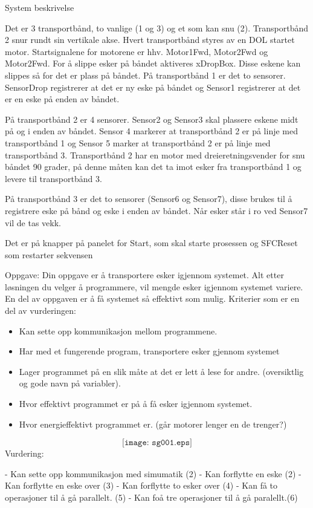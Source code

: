 

System beskrivelse

Det er 3 transportbånd, to vanlige (1 og 3) og et som kan snu (2). Transportbånd 2 snur rundt sin vertikale akse. Hvert transportbånd styres av en DOL startet motor. Startsignalene for motorene er hhv. Motor1Fwd, Motor2Fwd og Motor2Fwd. For å slippe esker på båndet aktiveres xDropBox. Disse eskene kan slippes så for det er plass på båndet. 
På transportbånd 1 er det to sensorer. SensorDrop registrerer at det er ny eske på båndet og Sensor1 registrerer at det er en eske på enden av båndet.
 
På transportbånd 2 er 4 sensorer. Sensor2 og Sensor3 skal plassere eskene midt på og i enden av båndet. Sensor 4 markerer at transportbånd 2 er på linje med transportbånd 1 og Sensor 5 marker at transportbånd 2 er på linje med transportbånd 3. Transportbånd 2 har en motor med dreieretningsvender for snu båndet 90 grader, på denne måten kan det ta imot esker fra transportbånd 1 og levere til transportbånd 3.

På transportbånd 3 er det to sensorer (Sensor6 og Sensor7), disse brukes til å registrere eske på bånd og eske i enden av båndet. Når esker står i ro ved Sensor7 vil de tas vekk. 

Det er på knapper på panelet for Start, som skal starte prosessen og SFCReset som restarter sekvensen 

Oppgave:
Din oppgave er å transportere esker igjennom systemet. Alt etter løsningen du velger å programmere, vil mengde esker igjennom systemet variere. En del av oppgaven er å få systemet så effektivt som mulig. 
Kriterier som er en del av vurderingen:
\begin{itemize}[noitemsep]
	\item Kan sette opp kommunikasjon mellom programmene. 
	\item Har med et fungerende program, transportere esker gjennom systemet
	\item Lager programmet på en slik måte at det er lett å lese for andre. (oversiktlig og gode navn på variabler). 
	\item Hvor effektivt programmet er på å få esker igjennom systemet. 
	\item Hvor energieffektivt programmet er. (går motorer lenger en de trenger?)
\end{itemize}

$$\texttt{[image: sg001.eps]}$$
Vurdering:

- Kan sette opp kommunikasjon med simumatik (2)
- Kan forflytte en eske (2)
- Kan forflytte en eske over (3)
- Kan forflytte to esker over (4)
- Kan få to operasjoner til å gå parallelt. (5)
- Kan foå tre operasjoner til å gå paralellt.(6)



